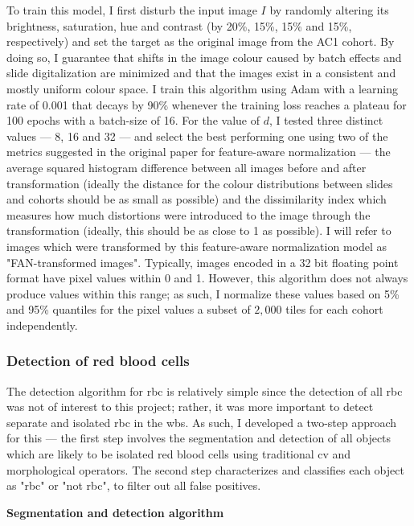 To train this model, I first disturb the input image $I$ by randomly altering its brightness, saturation, hue and contrast (by 20\%, 15\%, 15\% and 15\%, respectively) and set the target as the original image from the AC1 cohort. By doing so, I guarantee that shifts in the image colour caused by batch effects and slide digitalization are minimized and that the images exist in a consistent and mostly uniform colour space. I train this algorithm using Adam with a learning rate of 0.001 that decays by 90\% whenever the training loss reaches a plateau for 100 epochs with a batch-size of 16. For the value of $d$, I tested three distinct values --- 8, 16 and 32 --- and select the best performing one using two of the metrics suggested in the original paper for feature-aware normalization \cite{Bug2017-kk} --- the average squared histogram difference between all images before and after transformation (ideally the distance for the colour distributions between slides and cohorts should be as small as possible) and the dissimilarity index \cite{Wang2004-sl} which measures how much distortions were introduced to the image through the transformation (ideally, this should be as close to 1 as possible). I will refer to images which were transformed by this feature-aware normalization model as "FAN-transformed images". Typically, images encoded in a 32 bit floating point format have pixel values within 0 and 1. However, this algorithm does not always produce values within this range; as such, I normalize these values based on 5\% and 95\% quantiles for the pixel values a subset of $2,000$ tiles for each cohort independently.  

\subsubsection{Detection of red blood cells}

The detection algorithm for \ac{rbc} is relatively simple since the detection of all \ac{rbc} was not of interest to this project; rather, it was more important to detect separate and isolated \ac{rbc} in the \ac{wbs}. As such, I developed a two-step approach for this --- the first step involves the segmentation and detection of all objects which are likely to be isolated red blood cells using traditional \ac{cv} and morphological operators. The second step characterizes and classifies each object as "\ac{rbc}" or "not \ac{rbc}", to filter out all false positives.

\noindent \textbf{Segmentation and detection algorithm}

